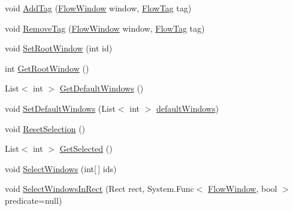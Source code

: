 \begin{DoxyCompactItemize}
void \hyperlink{class_unity_engine_1_1_u_i_1_1_windows_1_1_plugins_1_1_flow_1_1_flow_data_a65064cf8f745c356b94338913204416a}{Add\+Tag} (\hyperlink{class_unity_engine_1_1_u_i_1_1_windows_1_1_plugins_1_1_flow_1_1_flow_window}{Flow\+Window} window, \hyperlink{class_unity_engine_1_1_u_i_1_1_windows_1_1_plugins_1_1_flow_1_1_flow_tag}{Flow\+Tag} tag)
\item 
void \hyperlink{class_unity_engine_1_1_u_i_1_1_windows_1_1_plugins_1_1_flow_1_1_flow_data_a0e72836b933f4ac2e3a165b93d68610e}{Remove\+Tag} (\hyperlink{class_unity_engine_1_1_u_i_1_1_windows_1_1_plugins_1_1_flow_1_1_flow_window}{Flow\+Window} window, \hyperlink{class_unity_engine_1_1_u_i_1_1_windows_1_1_plugins_1_1_flow_1_1_flow_tag}{Flow\+Tag} tag)
\item 
void \hyperlink{class_unity_engine_1_1_u_i_1_1_windows_1_1_plugins_1_1_flow_1_1_flow_data_af041bd9838c52b8eb2145444ae57b4d4}{Set\+Root\+Window} (int id)
\item 
int \hyperlink{class_unity_engine_1_1_u_i_1_1_windows_1_1_plugins_1_1_flow_1_1_flow_data_a88c6425bf3b2b57a00b0e28bf4fae989}{Get\+Root\+Window} ()
\item 
List$<$ int $>$ \hyperlink{class_unity_engine_1_1_u_i_1_1_windows_1_1_plugins_1_1_flow_1_1_flow_data_a3992ed28a1bc9eb50f21d356f682c9fd}{Get\+Default\+Windows} ()
\item 
void \hyperlink{class_unity_engine_1_1_u_i_1_1_windows_1_1_plugins_1_1_flow_1_1_flow_data_a4863ed4f35442e5907fd06414adcd5e3}{Set\+Default\+Windows} (List$<$ int $>$ \hyperlink{class_unity_engine_1_1_u_i_1_1_windows_1_1_plugins_1_1_flow_1_1_flow_data_ab77722d19c70ba6cfa967a6d2d7eb8d8}{default\+Windows})
\item 
void \hyperlink{class_unity_engine_1_1_u_i_1_1_windows_1_1_plugins_1_1_flow_1_1_flow_data_ae7aede734ce046bcae17d927c86bd6a2}{Reset\+Selection} ()
\item 
List$<$ int $>$ \hyperlink{class_unity_engine_1_1_u_i_1_1_windows_1_1_plugins_1_1_flow_1_1_flow_data_a1169ac57dd172e497bc86ea0e190335d}{Get\+Selected} ()
\item 
void \hyperlink{class_unity_engine_1_1_u_i_1_1_windows_1_1_plugins_1_1_flow_1_1_flow_data_a18d2b03c020c85e0dbc1bdc49a171238}{Select\+Windows} (int\mbox{[}$\,$\mbox{]} ids)
\item 
void \hyperlink{class_unity_engine_1_1_u_i_1_1_windows_1_1_plugins_1_1_flow_1_1_flow_data_a8416a99c0e8f93db59a7a59b99839e59}{Select\+Windows\+In\+Rect} (Rect rect, System.\+Func$<$ \hyperlink{class_unity_engine_1_1_u_i_1_1_windows_1_1_plugins_1_1_flow_1_1_flow_window}{Flow\+Window}, bool $>$ predicate=null)

\end{DoxyCompactItemize}
